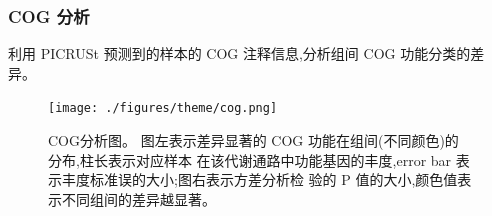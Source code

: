 \documentclass[a4paper,10pt]{article}
\numberwithin{figure}{section}
\numberwithin{table}{section}
\begin{document}
\subsubsection{COG 分析}
\label{Subsubsec：COG}
利用 PICRUSt 预测到的样本的 COG 注释信息,分析组间 COG 功能分类的差异。
\begin{figure}[H]
\centering
\label{Fig:COG}
\captionsetup{width=.8\textwidth,singlelinecheck = false, justification=justified}
 \texttt{[image: ./figures/theme/cog.png]}  
   \caption{COG分析图。 图左表示差异显著的 COG 功能在组间(不同颜色)的分布,柱长表示对应样本
在该代谢通路中功能基因的丰度,error bar 表示丰度标准误的大小;图右表示方差分析检
验的 P 值的大小,颜色值表示不同组间的差异越显著。}
\end{figure}





\newpage
\end{document}
